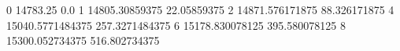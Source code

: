0 14783.25 0.0
1 14805.30859375 22.05859375
2 14871.576171875 88.326171875
4 15040.5771484375 257.3271484375
6 15178.830078125 395.580078125
8 15300.052734375 516.802734375
